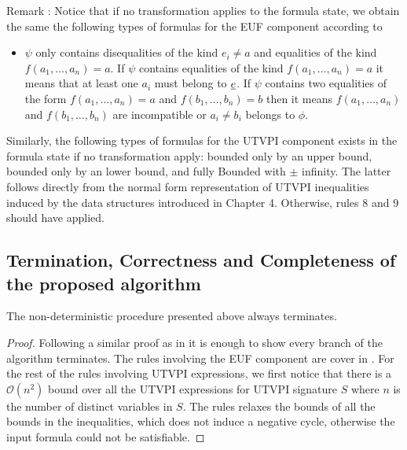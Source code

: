 Remark \label{my_remark}: Notice that if no transformation applies to the formula state, we obtain the same 
the following types of formulas for the EUF component according to \cite{ghilardi2020compactly} 

\begin{itemize}
  \item $\psi$ only contains disequalities of the kind $e_i \neq a$ and equalities of
    the kind $f(a_1, \dots, a_n) = a$. If $\psi$ contains equalities of the
    kind $f(a_1, \dots, a_n) = a$ it means that at least one $a_i$ must belong
    to $\underline{e}$. If $\psi$ contains two equalities of the form
    $f(a_1, \dots, a_n) = a$ and $f(b_1, \dots, b_n) = b$ then it means
    $f(a_1, \dots, a_n)$ and $f(b_1, \dots, b_n)$ are incompatible or $a_i \neq b_i$
    belongs to $\phi$.
\end{itemize}

Similarly, the following types of formulas for the UTVPI component exists in the
formula state if no transformation apply: bounded only by an upper bound, 
bounded only by an lower bound, and fully Bounded with $\pm$ infinity. The
latter follows directly from the normal form representation of UTVPI inequalities
induced by the data structures introduced in Chapter 4. Otherwise, rules
8 and 9 should have applied.

\subsection{Termination, Correctness and Completeness of the
proposed algorithm}

\begin{lemma}
  The non-deterministic procedure presented above 
  always terminates.
\end{lemma}

\begin{proof}
  Following a similar proof as in \cite{ghilardi2020compactly}
  it is enough to show every branch of the algorithm terminates.
  The rules involving the EUF component are cover in
  \cite{ghilardi2020compactly}. For the rest of the rules
  involving UTVPI expressions, we first notice that there is a 
  $\mathcal{O}(n^2)$ bound over all the UTVPI expressions
  for UTVPI signature $S$ where $n$ is the number of distinct
  variables in $S$. The rules relaxes the bounds of all the
  bounds in the inequalities, which does not induce a negative
  cycle, otherwise the input formula could not be satisfiable.
\end{proof} 

